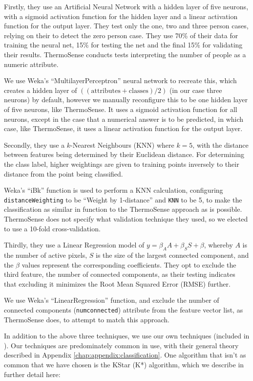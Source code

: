 \documentclass[../thesis/thesis.tex]{subfiles}
\begin{document}
Firstly, they use an Artificial Neural Network with a hidden layer of five neurons, with a sigmoid activation function for the hidden layer and a linear activation function for the output layer. They test only the one, two and three person cases, relying on their \pir to detect the zero person case. They use 70\% of their data for training the neural net, 15\% for testing the net and the final 15\% for validating their results. ThermoSense conducts tests interpreting the number of people as a numeric attribute.

We use Weka's ``MultilayerPerceptron'' neural network to recreate this, which creates a hidden layer of $((\mathrm{attributes} + \mathrm{classes}) / 2)$ (in our case three neurons) by default, however we manually reconfigure this to be one hidden layer of five neurons, like ThermoSense. It uses a sigmoid activation function for all neurons, except in the case that a numerical answer is to be predicted, in which case, like ThermoSense, it uses a linear activation function for the output layer.

Secondly, they use a $k$-Nearest Neighbours (KNN) where $k=5$, with the distance between features being determined by their Euclidean distance. For determining the class label, higher weightings are given to training points inversely to their distance from the point being classified.

Weka's ``iBk'' function is used to perform a KNN calculation, configuring \texttt{distanceWeighting} to be ``Weight by 1-distance'' and \texttt{KNN} to be 5, to make the classification as similar in function to the ThermoSense approach as is possible. ThermoSense does not specify what validation technique they used, so we elected to use a 10-fold cross-validation.

Thirdly, they use a Linear Regression model of $y = \beta_A A + \beta_S S + \beta $, whereby $A$ is the number of active pixels, $S$ is the size of the largest connected component, and the $\beta$ values represent the corresponding coefficients. They opt to exclude the third feature, the number of connected components, as their testing indicates that excluding it minimizes the Root Mean Squared Error (RMSE) further. 

We use Weka's ``LinearRegression'' function, and exclude the number of connected components (\texttt{numconnected}) attribute from the feature vector list, as ThermoSense does, to attempt to match this approach.

In addition to the above three techniques, we use our own techniques (included in ). Our techniques are predominately common in use, with their general theory described in Appendix \ref{chap:appendix:classification}. One algorithm that isn't as common that we have chosen is the KStar (K*) algorithm, which we describe in further detail here:
\end{document}
